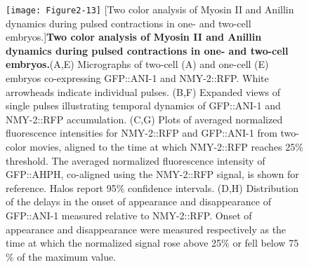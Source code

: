 \documentclass{ucetd}
\begin{document}
{{{{\begin{figure}[!htbp]
\end{figure}
















\begin{figure}[!htbp]
\centering
\texttt{[image: Figure2-13]}
[Two color analysis of Myosin II and Anillin dynamics during pulsed contractions in one- and two-cell embryos.]{\textbf{Two color analysis of Myosin II and Anillin dynamics during pulsed contractions in one- and two-cell embryos.}(A,E) Micrographs of two-cell (A) and one-cell (E) embryos co-expressing GFP::ANI-1 and NMY-2::RFP. White arrowheads indicate individual pulses. (B,F) Expanded views of single pulses illustrating temporal dynamics of GFP::ANI-1 and NMY-2::RFP accumulation. (C,G) Plots of averaged normalized fluorescence intensities for NMY-2::RFP and GFP::ANI-1 from two-color movies, aligned to the time at which NMY-2::RFP reaches 25$\%$ threshold. The averaged normalized fluorescence intensity of GFP::AHPH, co-aligned using the NMY-2::RFP signal, is shown for reference. Halos report 95$\%$ confidence intervals. (D,H) Distribution of the delays in the onset of appearance and disappearance of GFP::ANI-1 measured relative to NMY-2::RFP.  Onset of appearance and disappearance were measured respectively as the time at which the normalized signal rose above 25$\%$ or fell below 75$\%$ of the maximum value. }
\end{figure}




}}}}
\end{document}
